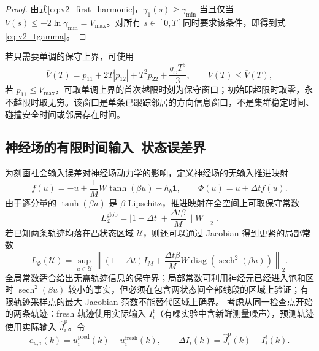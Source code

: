 \documentclass[UTF8,fontset=windows,11pt]{ctexart}
\begin{document}
\begin{proof}
由式\eqref{eq:v2_first_harmonic}，$\gamma_1(s)\ge\gamma_{\min}$ 当且仅当 $V(s)\le-2\ln\gamma_{\min}=V_{\max}$。对所有 $s\in[0,T]$同时要求该条件，即得到式\eqref{eq:v2_tgamma}。
\end{proof}

若只需要单调的保守上界，可使用
\begin{equation}
 \overline V(T)=p_{11}+2T|p_{12}|+T^2p_{22}+\frac{q_\omega T^3}{3},
 \qquad V(T)\le\overline V(T),
 \label{eq:v2_vupper}
\end{equation}
若 $p_{11}\le V_{\max}$，可取单调上界的首次越限时刻为保守窗口；初始即超限时取零，永不越限时取无穷。该窗口是单条已跟踪邻居的方向信息窗口，不是集群稳定时间、碰撞安全时间或邻居存在时间。

\subsection{神经场的有限时间输入--状态误差界}

为刻画社会输入误差对神经场动力学的影响，定义神经场的无输入推进映射
\begin{equation}
 f(u)=-u+\frac{1}{M}W\tanh(\beta u)-h_b\bm 1,
 \qquad
 \Phi(u)=u+\Delta t f(u).
 \label{eq:v2_field_map}
\end{equation}
由于逐分量的 $\tanh(\beta u)$ 是 $\beta$-Lipschitz，推进映射在全空间上可取保守常数
\begin{equation}
 L_\Phi^{\mathrm{glob}}
 =|1-\Delta t|+\frac{\Delta t\beta}{M}\|W\|_2.
 \label{eq:v2_global_lipschitz}
\end{equation}
若已知两条轨迹均落在凸状态区域 $\mathcal U$，则还可以通过 Jacobian 得到更紧的局部常数
\begin{equation}
 L_\Phi(\mathcal U)=
 \sup_{u\in\mathcal U}
 \left\|(1-\Delta t)I_M+
 \frac{\Delta t\beta}{M}W
 \operatorname{diag}\!\left(\operatorname{sech}^2(\beta u)\right)
 \right\|_2.
 \label{eq:v2_local_lipschitz}
\end{equation}
全局常数适合给出无需轨迹信息的保守界；局部常数可利用神经元已经进入饱和区时 $\operatorname{sech}^2(\beta u)$ 较小的事实，但必须在包含两状态间全部线段的区域上验证；有限轨迹采样点的最大 Jacobian 范数不能替代区域上确界。
考虑从同一检查点开始的两条轨迹：fresh 轨迹使用实际输入 $I_i^{\mathrm f}$（有噪实验中含新鲜测量噪声），预测轨迹使用实际输入 $\widehat J_i^{\mathrm p}$。令
\begin{equation}
 e_{u,i}(k)=u_i^{\mathrm{pred}}(k)-u_i^{\mathrm{fresh}}(k),
 \qquad
 \Delta I_i(k)=\widehat J_i^{\mathrm p}(k)-I_i^{\mathrm f}(k).
 \label{eq:v2_state_error}
\end{equation}
\end{document}
